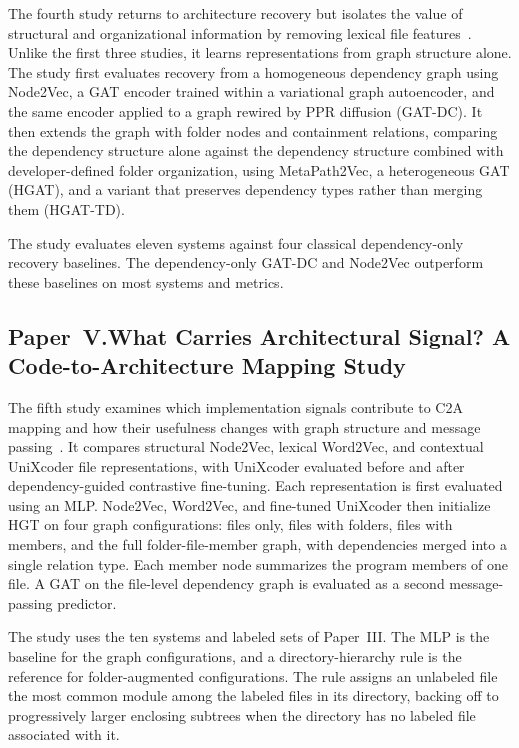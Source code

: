 The fourth study returns to architecture recovery but isolates the value of structural and organizational information by removing lexical file features~\cite{structsar}. Unlike the first three studies, it learns representations from graph structure alone. The study first evaluates recovery from a homogeneous dependency graph using Node2Vec, a GAT encoder trained within a variational graph autoencoder, and the same encoder applied to a graph rewired by PPR diffusion (GAT-DC). It then extends the graph with folder nodes and containment relations, comparing the dependency structure alone against the dependency structure combined with developer-defined folder organization, using MetaPath2Vec, a heterogeneous GAT (HGAT), and a variant that preserves dependency types rather than merging them (HGAT-TD).
 
The study evaluates eleven systems against four classical dependency-only recovery baselines. The dependency-only GAT-DC and Node2Vec outperform these baselines on most systems and metrics.

\subsection[Paper~V: C2A Mapping]{Paper~V.\quad What Carries Architectural Signal? A Code-to-Architecture Mapping Study}
\label{sec:overview-hetmap}

The fifth study examines which implementation signals contribute to C2A mapping and how their usefulness changes with graph structure and message passing~\cite{hetmap}. It compares structural Node2Vec, lexical Word2Vec, and contextual UniXcoder file representations, with UniXcoder evaluated before and after dependency-guided contrastive fine-tuning. Each representation is first evaluated using an MLP. Node2Vec, Word2Vec, and fine-tuned UniXcoder then initialize HGT on four graph configurations: files only, files with folders, files with members, and the full folder-file-member graph, with dependencies merged into a single relation type. Each member node summarizes the program members of one file. A GAT on the file-level dependency graph is evaluated as a second message-passing predictor.
 
The study uses the ten systems and labeled sets of Paper~III. The MLP is the baseline for the graph configurations, and a directory-hierarchy rule is the reference for folder-augmented configurations. The rule assigns an unlabeled file the most common module among the labeled files in its directory, backing off to progressively larger enclosing subtrees when the directory has no labeled file associated with it.
